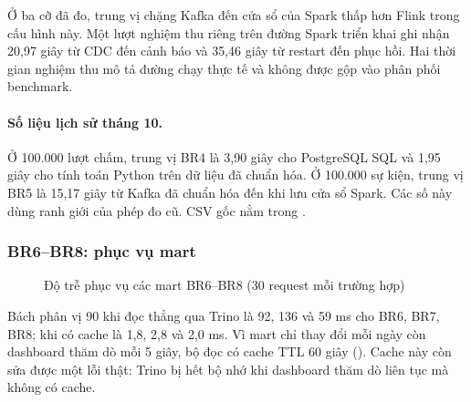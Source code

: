 


Ở ba cỡ đã đo, trung vị chặng Kafka đến cửa sổ của Spark thấp hơn Flink trong cấu hình này. Một lượt nghiệm thu riêng trên đường Spark triển khai ghi nhận 20{,}97 giây từ CDC đến cảnh báo và 35{,}46 giây từ restart đến phục hồi. Hai thời gian nghiệm thu mô tả đường chạy thực tế và không được gộp vào phân phối benchmark.

\paragraph{Số liệu lịch sử tháng 10.} Ở 100.000 lượt chấm, trung vị BR4 là 3{,}90 giây cho PostgreSQL SQL và 1{,}95 giây cho tính toán Python trên dữ liệu đã chuẩn hóa. Ở 100.000 sự kiện, trung vị BR5 là 15{,}17 giây từ Kafka đã chuẩn hóa đến khi lưu cửa sổ Spark. Các số này dùng ranh giới của phép đo cũ. CSV gốc nằm trong .

\subsubsection{BR6--BR8: phục vụ mart}

\begin{figure}[H]
\centering
{}
\caption{Độ trễ phục vụ các mart BR6--BR8 (30 request mỗi trường hợp)}
\label{fig:serving}
\end{figure}

Bách phân vị 90 khi đọc thẳng qua Trino là 92, 136 và 59 ms cho BR6, BR7, BR8; khi có cache là 1,8, 2,8 và 2,0 ms. Vì mart chỉ thay đổi mỗi ngày còn dashboard thăm dò mỗi 5 giây, bộ đọc có cache TTL 60 giây (). Cache này còn sửa được một lỗi thật: Trino bị hết bộ nhớ khi dashboard thăm dò liên tục mà không có cache.

